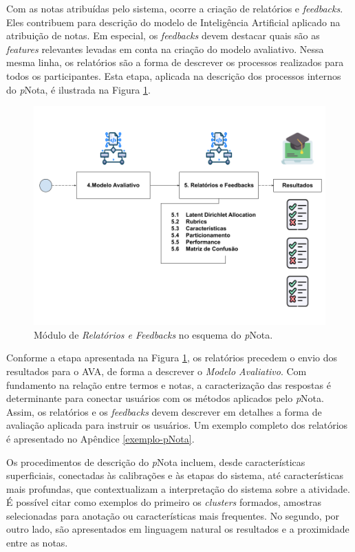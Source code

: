 Com as notas atribuídas pelo sistema, ocorre a criação de relatórios e \textit{feedbacks}. Eles contribuem para descrição do modelo de Inteligência Artificial aplicado na atribuição de notas. Em especial, os \textit{feedbacks} devem destacar quais são as \textit{features} relevantes levadas em conta na criação do modelo avaliativo. Nessa mesma linha, os relatórios são a forma de descrever os processos realizados para todos os participantes. Esta etapa, aplicada na descrição dos processos internos do \textit{p}Nota, é ilustrada na Figura \ref{fig-rf}. 

\begin{figure}[!h]
\centering
\includegraphics[width=\textwidth]{figuras/esquema-rf-pNota.png}
\caption{Módulo de \textit{Relatórios e Feedbacks} no esquema do \textit{p}Nota.}
\label{fig-rf}
\end{figure}


Conforme a etapa apresentada na Figura \ref{fig-rf}, os relatórios precedem o envio dos resultados para o AVA, de forma a descrever o \textit{Modelo Avaliativo}. Com fundamento na relação entre termos e notas, a caracterização das respostas é determinante para conectar usuários com os métodos aplicados pelo \textit{p}Nota. Assim, os relatórios e os \textit{feedbacks} devem descrever em detalhes a forma de avaliação aplicada para instruir os usuários. Um exemplo completo dos relatórios é apresentado no Apêndice \ref{exemplo-pNota}.

Os procedimentos de descrição do \textit{p}Nota incluem, desde características superficiais, conectadas às calibrações e às etapas do sistema, até características mais profundas, que contextualizam a interpretação do sistema sobre a atividade. É possível citar como exemplos do primeiro os \textit{clusters} formados, amostras selecionadas para anotação ou características mais frequentes. No segundo, por outro lado, são apresentados em linguagem natural os resultados e a proximidade entre as notas.



